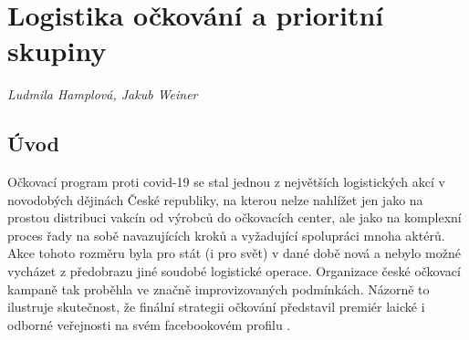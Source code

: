 
\chapter{Logistika očkování a prioritní skupiny}\label{Logistika_ockovani}

\textit{Ludmila Hamplová, Jakub Weiner}
\vspace{15mm}


\section*{Úvod} %
Očkovací program proti covid-19 se stal jednou z největších logistických akcí v novodobých dějinách České republiky, na kterou nelze nahlížet jen jako na prostou distribuci vakcín od výrobců do očkovacích center, ale jako na komplexní proces řady na sobě navazujících kroků a vyžadující spolupráci mnoha aktérů. Akce tohoto rozměru byla pro stát (i pro svět) v dané době nová a nebylo možné vycházet z předobrazu jiné soudobé logistické operace. Organizace české očkovací kampaně tak proběhla ve značně improvizovaných podmínkách. %
Názorně to ilustruje skutečnost, že finální strategii očkování představil premiér laické i odborné veřejnosti na svém facebookovém profilu \cite{logoc_caulidi}. 

